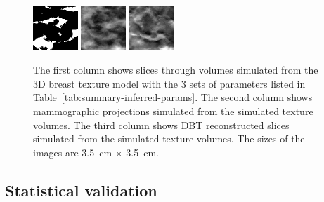 \documentclass[journal]{IEEEtran}
\begin{document}
\begin{figure}[!htb]
  \includegraphics[width=0.15\textwidth]
  {figure/all/dataset_11/sim_vol_small}
  \includegraphics[width=0.15\textwidth]
  {figure/all/dataset_11/sim_proj}
  \includegraphics[width=0.15\textwidth]
  {figure/all/dataset_11/sim_recon}

  \caption{The first column shows slices through volumes simulated
    from the 3D breast texture model with the 3 sets of parameters
    listed in Table~\ref{tab:summary-inferred-params}. The second
    column shows mammographic projections simulated from the simulated
    texture volumes. The third column shows DBT reconstructed slices
    simulated from the simulated texture volumes. The sizes of the
    images are \SI{3.5}{\cm} $\times$ \SI{3.5}{\cm}.}
  \label{fig:fit-params-sims}
\end{figure}

\subsection{Statistical validation}
\label{sec:stat-valid}
\end{document}
